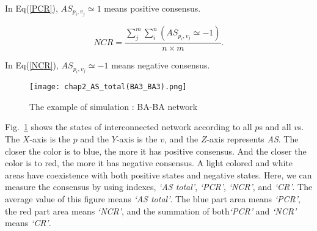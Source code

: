 In Eq(\ref{PCR}),  ${A{S_{{p _i},{v _j}}} \simeq  1}$ means positive consensus.

\begin{equation}
NCR = \frac{{\sum\limits_j^m {\sum\limits_i^n {(A{S_{{p _i},{v _j}}} \simeq   - 1)} } }}{{n \times m}}.
\label{NCR}
\end{equation}

In Eq(\ref{NCR}), ${A{S_{{p _i},{v _j}}} \simeq  -1}$ means negative consensus.


\begin{figure}[!htb]
	\centering
	\texttt{[image: chap2\_AS\_total(BA3\_BA3).png]}
	\caption{The example of simulation : BA-BA network}
	\label{chap2_AS_total(BA3_BA3)}
\end{figure}

Fig.~\ref{chap2_AS_total(BA3_BA3)} shows the states of interconnected network according to all $p$s and all $v$s. The $X$-axis is the $p$ and the $Y$-axis is the $v$, and the $Z$-axis represents \textit{AS}. The closer the color is to blue, the more it has positive consensus. And the closer the color is to red, the more it has negative consensus. A light colored and white areas have coexistence with both positive states and negative states. Here, we can measure the consensus by using indexes, \textit{`AS total'}, \textit{`PCR'}, \textit{`NCR'}, and \textit{`CR'}. The average value of this figure means \textit{`AS total'}. The blue part area means \textit{`PCR'}, the red part area means \textit{`NCR'}, and the summation of both\textit{`PCR'} and \textit{`NCR'} means \textit{`CR'}. 



    
